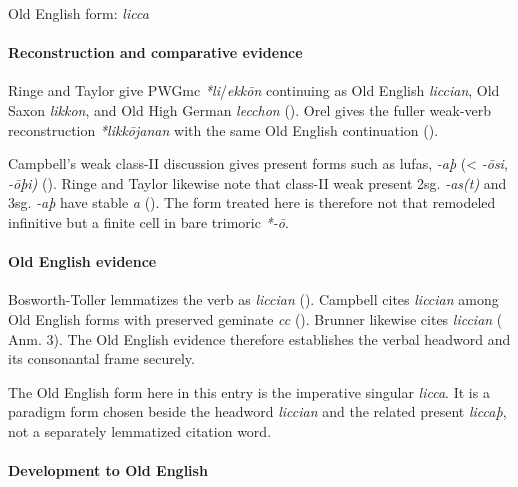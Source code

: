 \documentclass[
  british,
  a4paper,
]{article}
\begin{document}
Old English form: \emph{licca}

\paragraph{Reconstruction and comparative
evidence}\label{reconstruction-and-comparative-evidence-63}

Ringe and Taylor give PWGmc \emph{*li}/\emph{ekkōn} continuing as Old
English \emph{liccian}, Old Saxon \emph{likkon}, and Old High German
\emph{lecchon} (). Orel gives the fuller weak-verb reconstruction \emph{*likkōjanan}
with the same Old English continuation ().

Campbell's weak class-II discussion gives present forms such as lufas,
\emph{-aþ} (\textless{} \emph{-ōsi}, \emph{-ōþi)}
(). Ringe and
Taylor likewise note that class-II weak present 2sg. \emph{-as(t)} and
3sg. \emph{-aþ} have stable \emph{a}
(). The form
treated here is therefore not that remodeled infinitive but a finite
cell in bare trimoric \emph{*-ō}.

\paragraph{Old English evidence}\label{old-english-evidence-63}

Bosworth-Toller lemmatizes the verb as \emph{liccian}
().
Campbell cites \emph{liccian} among Old English forms with preserved
geminate \emph{cc} (). Brunner likewise cites \emph{liccian}
( Anm. 3). The
Old English evidence therefore establishes the verbal headword and its
consonantal frame securely.

The Old English form here in this entry is the imperative singular
\emph{licca}. It is a paradigm form chosen beside the headword
\emph{liccian} and the related present \emph{liccaþ}, not a separately
lemmatized citation word.

\paragraph{Development to Old
English}\label{development-to-old-english-63}
\end{document}
